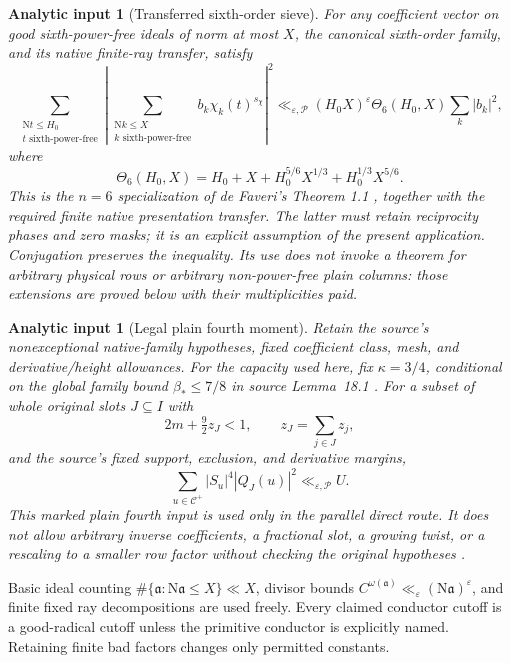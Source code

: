 \documentclass[11pt]{article}
\newtheorem{analyticinput}[theorem]{Analytic input}
\theoremstyle{definition}
\newcommand{\N}{\mathrm N}
\newcommand{\eps}{\varepsilon}
\newcommand{\Cplus}{\mathcal C^+}
\newcommand{\lls}{\ll_{\eps,\mathcal P}}
\begin{document}
\begin{analyticinput}[Transferred sixth-order sieve]\label{in-sieve}
For any coefficient vector on good sixth-power-free ideals of norm at most $X$, the canonical sixth-order family, and its native finite-ray transfer, satisfy
\begin{equation}\label{eq-theta6-input}
 \sum_{\substack{\N t\le H_0\\t\text{ sixth-power-free}}}
 \left|\sum_{\substack{\N k\le X\\k\text{ sixth-power-free}}}
 b_k\chi_k(t)^{s_\chi}\right|^2
 \ll_{\eps,\mathcal P}(H_0X)^\eps
 \Theta_6(H_0,X)\sum_k|b_k|^2,
\end{equation}
where
\[
 \Theta_6(H_0,X)=H_0+X+H_0^{5/6}X^{1/3}+H_0^{1/3}X^{5/6}.
\]
This is the $n=6$ specialization of de Faveri's Theorem 1.1 \cite{df}, together with the required finite native presentation transfer. The latter must retain reciprocity phases and zero masks; it is an explicit assumption of the present application. Conjugation preserves the inequality. Its use does not invoke a theorem for arbitrary physical rows or arbitrary non-power-free plain columns: those extensions are proved below with their multiplicities paid.
\end{analyticinput}

\begin{analyticinput}[Legal plain fourth moment]\label{in-fourth}
Retain the source's nonexceptional native-family hypotheses, fixed coefficient class, mesh, and derivative/height allowances. For the capacity used here, fix $\kappa=3/4$, conditional on the global family bound $\beta_*\le7/8$ in source Lemma~18.1 \cite{source-primary}. For a subset of whole original slots $J\subseteq I$ with
\[
 2m+\tfrac92 z_J<1,\qquad z_J=\sum_{j\in J}z_j,
\]
and the source's fixed support, exclusion, and derivative margins,
\begin{equation}\label{eq-plain-fourth-input}
 \sum_{u\in\Cplus}|S_u|^4|Q_J(u)|^2\lls U.
\end{equation}
This marked plain fourth input is used only in the parallel direct route. It does not allow arbitrary inverse coefficients, a fractional slot, a growing twist, or a rescaling to a smaller row factor without checking the original hypotheses \cite{n6,n7}.
\end{analyticinput}

Basic ideal counting $\#\{\mathfrak a:\N\mathfrak a\le X\}\ll X$, divisor bounds $C^{\omega(\mathfrak a)}\ll_\eps(\N\mathfrak a)^\eps$, and finite fixed ray decompositions are used freely. Every claimed conductor cutoff is a good-radical cutoff unless the primitive conductor is explicitly named. Retaining finite bad factors changes only permitted constants.
\end{document}
